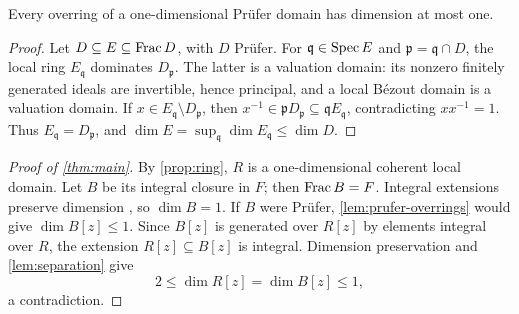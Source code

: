\begin{lemma}\label{lem:prufer-overrings}
Every overring of a one-dimensional Pr\"ufer domain has dimension
at most one.
\end{lemma}
\begin{proof}
Let $D\subseteq E\subseteq\operatorname{Frac} D$, with $D$ Pr\"ufer. For
$\mathfrak q\in\operatorname{Spec} E$ and $\mathfrak p=\mathfrak q\cap D$,
the local ring $E_{\mathfrak q}$ dominates $D_{\mathfrak p}$.
The latter is a valuation domain: its nonzero finitely generated
ideals are invertible, hence principal, and a local B\'ezout domain
is a valuation domain. If $x\in E_{\mathfrak q}\setminus D_{\mathfrak p}$,
then $x^{-1}\in\mathfrak pD_{\mathfrak p}\subseteq
\mathfrak qE_{\mathfrak q}$, contradicting $x x^{-1}=1$.
Thus $E_{\mathfrak q}=D_{\mathfrak p}$, and
$\dim E=\sup_{\mathfrak q}\dim E_{\mathfrak q}\leq\dim D$.
\end{proof}

\begin{proof}[Proof of \cref{thm:main}]
By \cref{prop:ring}, $R$ is a one-dimensional coherent local domain.
Let $B$ be its integral closure in $F$; then $\operatorname{Frac} B=F$.
Integral extensions preserve dimension \cite[Tag~00OK]{StacksProject},
so $\dim B=1$.
If $B$ were Pr\"ufer, \cref{lem:prufer-overrings} would give
$\dim B[z]\leq1$. Since $B[z]$ is generated over $R[z]$ by elements
integral over $R$, the extension $R[z]\subseteq B[z]$ is integral.
Dimension preservation and \cref{lem:separation} give
\[
 2\leq\dim R[z]=\dim B[z]\leq1,
\]
a contradiction.
\end{proof}

